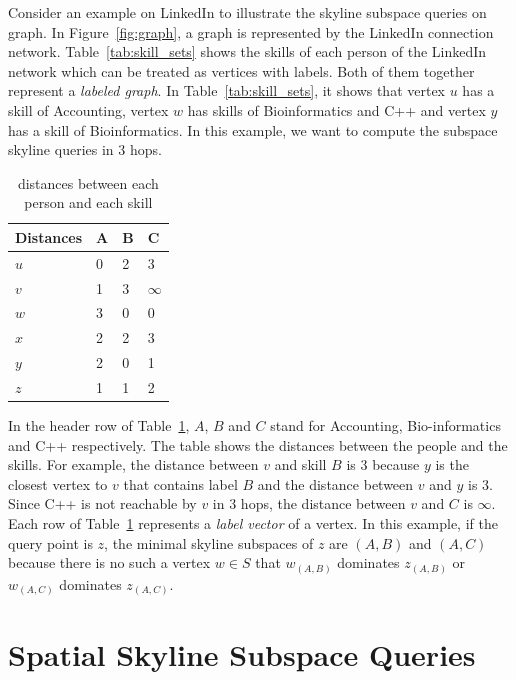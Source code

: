 Consider an example on LinkedIn to illustrate the skyline subspace queries on graph. In Figure~\ref{fig:graph}, a graph is represented by the LinkedIn connection network. Table~\ref{tab:skill_sets} shows the skills of each person of the LinkedIn network which can be treated as vertices with labels. 
Both of them together represent a \emph{labeled graph}. In Table~\ref{tab:skill_sets}, it shows that vertex $u$ has a skill of Accounting, vertex $w$ has skills of Bioinformatics and C++ and vertex $y$ has a skill of Bioinformatics. In this example, we want to compute the subspace skyline queries in $3$ hops.

\begin{table}[h]
    \centering
    \begin{tabular}{llll}
    \hline
        Distances & A & B & C \\ \hline
        $u$       & 0 & 2 & 3 \\ \hline
        $v$       & 1 & 3 & $\infty$ \\ \hline
        $w$       & 3 & 0 & 0 \\ \hline
        $x$       & 2 & 2 & 3 \\ \hline
        $y$       & 2 & 0 & 1 \\ \hline
        $z$       & 1 & 1 & 2 \\ \hline
    \end{tabular}
    \caption{\label{tab:distances_graph} distances between each person and each skill}
    
\end{table}

In the header row of Table~\ref{tab:distances_graph}, $A$, $B$ and $C$ stand for Accounting, Bio-informatics and C++ respectively. The table shows the distances between the people and the skills. For example, the distance between $v$ and skill $B$ is $3$ because $y$ is the closest vertex to $v$ that contains label $B$ and the distance between $v$ and $y$ is $3$. Since C++ is not reachable by $v$ in $3$ hops, the distance between $v$ and $C$ is $\infty$. Each row of Table~\ref{tab:distances_graph} represents a \emph{label vector} of a vertex.
In this example, if the query point is $z$, the minimal skyline subspaces of $z$ are $(A, B)$ and $(A, C)$ because there is no such a vertex $w \in S$ that $w_{(A,B)}$ dominates $z_{(A,B)}$ or $w_{(A,C)}$ dominates $z_{(A,C)}$.


\section{Spatial Skyline Subspace Queries}

